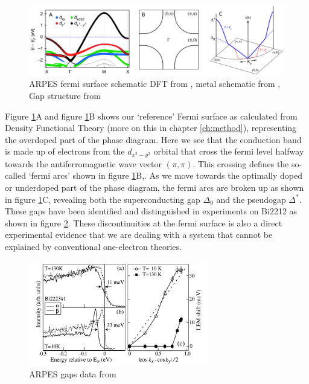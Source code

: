 \begin{figure}
    \centering
    \includegraphics[width=\textwidth]{fig/intro/arpes_fermisurface.png}
    \caption[ARPES fermi surface schematic]{ARPES fermi surface schematic DFT from \cite{Matt2018}, metal schematic from \cite{Damascelli2003}, Gap structure from \cite{Yoshida2011}}
    \label{fig:intro_arpes}
\end{figure}

Figure \ref{fig:intro_arpes}A and figure \ref{fig:intro_arpes}B shows our `reference' Fermi surface as calculated from Density Functional Theory (more on this in chapter \ref{ch:method}), representing the overdoped part of the phase diagram. Here we see that the conduction band is made up of electrons from the $d_{x^2-y^2}$ orbital that cross the fermi level halfway towards the antiferromagnetic wave vector $(\pi,\pi)$. This crossing defines the so-called `fermi arcs' shown in figure \ref{fig:intro_arpes}B,. As we move towards the optimally doped or underdoped part of the phase diagram, the fermi arcs are broken up as shown in figure \ref{fig:intro_arpes}C, revealing both the superconducting gap $\Delta_0$ and the pseudogap $\Delta^*$. These gaps have been identified and distinguished in experiments on Bi2212 as shown in figure \ref{fig:intro_arpes_feng}. These discontinuities at the fermi surface is also a direct experimental evidence that we are dealing with a system that cannot be explained by conventional one-electron theories.

\begin{figure}[]
    \centering
    \includegraphics[width=0.7\textwidth]{fig/intro/arpes_feng.png}
    \caption[ARPES gaps data]{ARPES gaps data from \cite{Feng2002}}
    \label{fig:intro_arpes_feng}
\end{figure}

